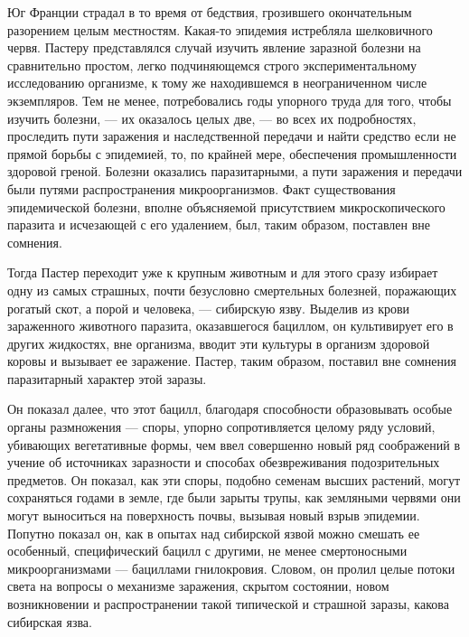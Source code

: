 Юг Франции  страдал в  то время  от бедствия,  грозившего  окончательным
разорением целым местностям.  Какая-то эпидемия истребляла  шелковичного
червя. Пастеру представлялся случай изучить явление заразной болезни  на
сравнительно  простом,  легко  подчиняющемся  строго  экспериментальному
исследованию организме, к  тому же находившемся  в неограниченном  числе
экземпляров. Тем не менее, потребовались  годы упорного труда для  того,
чтобы  изучить  болезни,  ---  их  оказалось  целых  две,  ---  во  всех  их
подробностях, проследить  пути  заражения и  наследственной  передачи  и
найти средство если не прямой борьбы  с эпидемией, то, по крайней  мере,
обеспечения   промышленности   здоровой   греной.   Болезни    оказались
паразитарными, а пути заражения  и передачи были путями  распространения
микроорганизмов.  Факт  существования   эпидемической  болезни,   вполне
объясняемой присутствием микроскопического паразита  и исчезающей с  его
удалением, был, таким образом, поставлен вне сомнения.

Тогда Пастер переходит уже к крупным животным и для этого сразу избирает
одну  из  самых   страшных,  почти   безусловно  смертельных   болезней,
поражающих рогатый скот, а порой  и человека, --- сибирскую язву.  Выделив
из крови  зараженного  животного  паразита,  оказавшегося  бациллом,  он
культивирует его в других жидкостях, вне организма, вводит эти  культуры
в организм  здоровой  коровы  и вызывает  ее  заражение.  Пастер,  таким
образом, поставил вне сомнения паразитарный характер этой заразы.

Он показал далее,  что этот бацилл,  благодаря способности  образовывать
особые органы  размножения ---  споры, упорно  сопротивляется целому  ряду
условий, убивающих  вегетативные формы,  чем ввел  совершенно новый  ряд
соображений в учение об источниках заразности и способах  обезвреживания
подозрительных предметов.  Он показал,  как эти  споры, подобно  семенам
высших растений,  могут  сохраняться годами  в  земле, где  были  зарыты
трупы, как земляными червями они могут выноситься на поверхность  почвы,
вызывая новый  взрыв эпидемии.  Попутно  показал он,  как в  опытах  над
сибирской язвой  можно  смешать  ее особенный,  специфический  бацилл  с
другими,   не   менее   смертоносными   микроорганизмами   ---   бациллами
гнилокровия. Словом, он пролил целые потоки света на вопросы о механизме
заражения, скрытом  состоянии,  новом  возникновении  и  распространении
такой типической и страшной заразы, какова сибирская язва.

